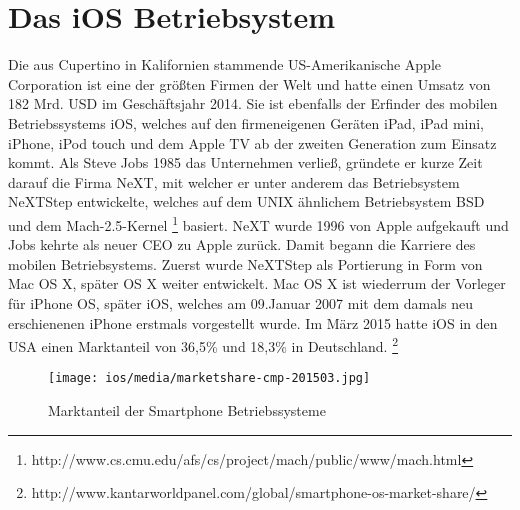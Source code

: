 \section{Das iOS Betriebsystem}
	Die aus Cupertino in Kalifornien stammende US-Amerikanische Apple Corporation
	ist eine der größten Firmen der Welt und hatte einen Umsatz von 182 Mrd.
	USD im Geschäftsjahr 2014. Sie ist ebenfalls der Erfinder des mobilen
	Betriebssystems iOS, welches auf den firmeneigenen Geräten iPad, iPad mini,
	iPhone, iPod touch und dem Apple TV ab der zweiten Generation zum Einsatz
	kommt. Als Steve Jobs 1985 das Unternehmen verließ, gründete er
	kurze Zeit darauf die Firma NeXT, mit welcher er unter anderem das
	Betriebsystem NeXTStep entwickelte, welches auf dem UNIX ähnlichem
	Betriebsystem BSD\cite{Tanenbaum2009} und dem	Mach-2.5-Kernel
	\footnote{http://www.cs.cmu.edu/afs/cs/project/mach/public/www/mach.html}
	basiert. NeXT wurde 1996 von Apple aufgekauft und Jobs kehrte als neuer CEO zu
	Apple zurück. Damit begann die Karriere des mobilen Betriebsystems. Zuerst
	wurde NeXTStep als Portierung in Form von Mac OS X, später OS X weiter
	entwickelt. Mac OS X ist wiederrum der Vorleger für iPhone OS, später iOS,
	welches am 09.Januar 2007 mit dem damals neu erschienenen iPhone erstmals
	vorgestellt wurde. Im März 2015 hatte iOS in den USA einen Marktanteil von
	36,5\% und 18,3\% in Deutschland.
	\footnote{http://www.kantarworldpanel.com/global/smartphone-os-market-share/}\\
	
	\begin{figure}[h]
		\centering
		\texttt{[image: ios/media/marketshare-cmp-201503.jpg]}
		\caption{Marktanteil der Smartphone Betriebssysteme
		\cite{MobileOsStat}}
		\label{fig:marcetshare}
	\end{figure}